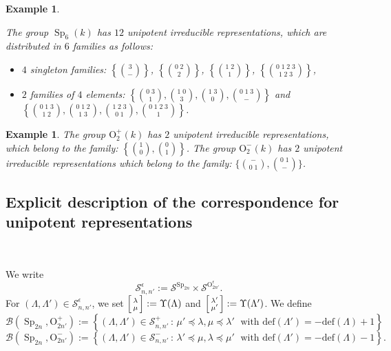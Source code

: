\documentclass[12pt]{amsart}
\numberwithin{equation}{subsection}
\newtheorem{example}[equation]{Example}
\newcommand{\cS}{\mathcal{S}}
\newcommand{\Sp}{\operatorname{Sp}}
\def\rO{{\mathrm{O}}}
\def\cB{{\mathcal{B}}}
\def\defect{{\mathrm{def}}}
\begin{document}
\begin{example} \label{ex:Sp6} {\rm
The group $\Sp_6(k)$ has $12$ unipotent irreducible representations, which are distributed in $6$ families as follows:
\begin{itemize} 
\item $4$ singleton families:
$\left\{\binom{3}{-}\right\}$, $\left\{\binom{0\; 2}{2}\right\}$, $\left\{\binom{1\; 2}{1}\right\}$, $\left\{\binom{0\; 1\; 2\; 3}{1\; 2\; 3}\right\}$, 
\item
$2$ families of $4$ elements:
$\left\{\binom{0\;3}{1},\binom{1\; 0}{3},\binom{1\; 3}{0},\binom{0\; 1\; 3}{-}\right\}$ and $\left\{\binom{0\; 1\; 3}{1\; 2},\binom{0\; 1\; 2}{1\; 3},\binom{1\; 2\; 3}{0\; 1},\binom{0\; 1\; 2\; 3}{1}\right\}$.
\end{itemize}
}
\end{example}
\begin{example} \label{ex:O2} {\rm
The group $\rO^+_2(k)$  has $2$ unipotent irreducible representations, which belong to the family:
$\left\{\binom{1}{0},\binom{0}{1}\right\}$.
The group $\rO^-_2(k)$ has $2$ unipotent irreducible representations which belong to the family:
$\bigl\{\binom{-}{0\; 1},\binom{0\; 1}{-}\bigr\}$.
}
\end{example}


\subsection{Explicit description of the correspondence for unipotent representations}\

We write
\begin{equation} \cS_{n,n'}^{\epsilon}:=\cS^{\Sp_{2n}}\times\cS^{\rO^\epsilon_{2n'}}.
\end{equation}
For $(\Lambda,\Lambda')\in\cS_{n,n'}^\epsilon$, we set 
$\left[\begin{smallmatrix} \lambda\vphantom{\lambda'}\cr \mu\vphantom{\mu'}\end{smallmatrix}\right]:=\Upsilon(\Lambda)$ and
$\left[\begin{smallmatrix} \lambda'\cr \mu'\end{smallmatrix}\right]:=\Upsilon(\Lambda')$.
We define
\[
\cB(\Sp_{2n},\rO^+_{2n'}):=\left\{(\Lambda,\Lambda')\in\cS_{n,n'}^+\,:\,\mu'\preceq \lambda, \mu\preceq \lambda'\;\text{ with $\defect(\Lambda')=-\defect(\Lambda)+1$}\right\}
\]
\[
\cB(\Sp_{2n},\rO^-_{2n'}):=\left\{(\Lambda,\Lambda')\in\cS_{n,n'}^-\,:\, \lambda'\preceq \mu, \lambda\preceq \mu'\;\text{ with $\defect(\Lambda')=-\defect(\Lambda)-1$}\right\}.
\]
\end{document}
